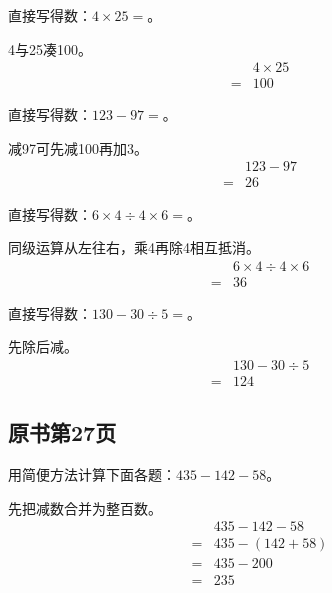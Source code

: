 直接写得数：\(4\times25=\)。\par
\begin{BookAnswer}
4与25凑100。\[\begin{aligned} &4\times25\\={}&100\end{aligned}\]
\end{BookAnswer}

直接写得数：\(123-97=\)。\par
\begin{BookAnswer}
减97可先减100再加3。\[\begin{aligned} &123-97\\={}&26\end{aligned}\]
\end{BookAnswer}

直接写得数：\(6\times4\div4\times6=\)。\par
\begin{BookAnswer}
同级运算从左往右，乘4再除4相互抵消。\[\begin{aligned} &6\times4\div4\times6\\={}&36\end{aligned}\]
\end{BookAnswer}

直接写得数：\(130-30\div5=\)。\par
\begin{BookAnswer}
先除后减。\[\begin{aligned} &130-30\div5\\={}&124\end{aligned}\]
\end{BookAnswer}



\subsection*{原书第27页}

用简便方法计算下面各题：\(435-142-58\)。\par
\begin{BookAnswer}
先把减数合并为整百数。\[\begin{aligned} &435-142-58\\={}&435-(142+58)\\={}&435-200\\={}&235\end{aligned}\]
\end{BookAnswer}

